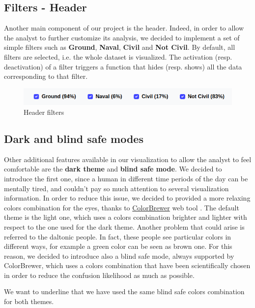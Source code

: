 \subsection{Filters - Header}
Another main component of our project is the header. Indeed, in order to allow the analyst to further customize its analysis, we decided to implement a set of simple filters such as \textbf{Ground}, \textbf{Naval}, \textbf{Civil} and \textbf{Not Civil}. By default, all filters are selected, i.e. the whole dataset is visualized. The activation (resp. deactivation) of a filter triggers a function that hides (resp. shows) all the data corresponding to that filter.
\begin{figure}[h]
\centering
\includegraphics[scale=0.32]{./images/header_filters.png}
\caption{Header filters}
\end{figure}

\subsection{Dark and blind safe modes}
Other additional features available in our visualization to allow the analyst to feel comfortable are the \textbf{dark theme} and \textbf{blind safe mode}. We decided to introduce the first one, since a human in different time periods of the day can be mentally tired, and couldn't pay so much attention to several visualization information. In order to reduce this issue, we decided to provided a more relaxing colors combination for the eyes, thanks to \href{https://colorbrewer2.org/}{ColorBrewer} web tool \cite{HB03}. The default theme is the light one, which uses a colors combination brighter and lighter with respect to the one used for the dark theme. Another problem that could arise is referred to the daltonic people. In fact, these people see particular colors in different ways, for example a green color can be seen as brown one. For this reason, we decided to introduce also a blind safe mode, always supported by ColorBrewer, which uses a colors combination that have been scientifically chosen in order to reduce the confusion likelihood as much as possible.

We want to underline that we have used the same blind safe colors combination for both themes.